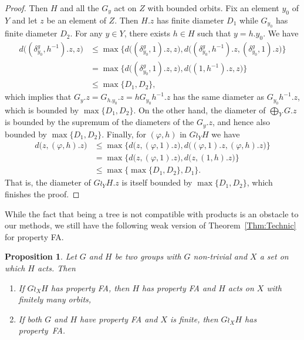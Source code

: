 \documentclass[a4paper]{article}
\newtheorem{prop}[lem]{Proposition}
\theoremstyle{definition}
\theoremstyle{remark}%
\begin{document}
\begin{proof}
Then $H$ and all the $G_y$ act on $Z$ with bounded orbits.
Fix an element $y_0$ of $Y$ and let $z$ be an element of $Z$.
Then $H.z$ has finite diameter $D_1$ while $G_{y_0}$ has finite diameter $D_2$.
For any $y\in Y$, there exists $h\in H$ such that $y=h.y_0$.
We have
\begin{align*}
	d\bigl((\delta_{y_0}^g,h^{-1}).z,z\bigr)&\leq\max\{d\bigl((\delta_{y_0}^g,1).z,z\bigr),d\bigl((\delta_{y_0}^g,h^{-1}).z,(\delta_{y_0}^g,1).z\bigr)\}\\
	&=\max\{d\bigl((\delta_{y_0}^g,1).z,z\bigr),d\bigl((1,h^{-1}).z,z\bigr)\}\\
	&\leq \max\{D_1,D_2\},
\end{align*}
which implies that $G_y.z=G_{h.y_0}.z=hG_{y_0}h^{-1}.z$ has the same diameter as $G_{y_0}h^{-1}.z$, which is bounded by $\max\{D_1,D_2\}$.
On the other hand, the diameter of $\bigoplus_YG.z$ is bounded by the supremum of the diameters of the $G_y.z$, and hence also bounded by $\max\{D_1,D_2\}$.
Finally, for $(\varphi,h)$ in $G\wr_YH$ we have 
\begin{align*}
	d\bigl(z,(\varphi,h).z\bigr)&\leq\max\{d\bigl(z,(\varphi,1).z\bigr),d\bigl((\varphi,1).z,(\varphi,h).z\bigr)\}\\
	&=\max\{d\bigl(z,(\varphi,1).z\bigr),d\bigl(z,(1,h).z\bigr)\}\\
	&\leq\max\{\max\{D_1,D_2\},D_1\}.
\end{align*}
That is, the diameter of $G\wr_YH.z$ is itself bounded by $\max\{D_1,D_2\}$, which finishes the proof.
\end{proof}
%
%
While the fact that being a tree is not compatible with products is an obstacle to our methods, we still have the following weak version of Theorem~\ref{Thm:Technic} for property FA.
%
%
\begin{prop}\label{Prop:WRFA}
Let $G$ and $H$ be two groups with $G$ non-trivial and $X$ a set on which $H$ acts.
Then
\begin{enumerate}
\item If $G\wr_XH$ has property FA, then $H$ has property FA and $H$ acts on $X$ with finitely many orbits,
\item If both $G$ and $H$ have property FA and $X$ is finite, then $G\wr_XH$ has property~FA.
\end{enumerate}
\end{prop}
\end{document}
